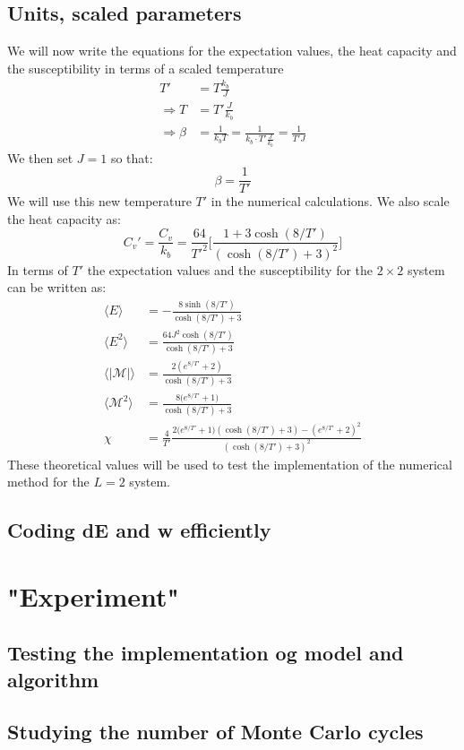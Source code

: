 \documentclass[11pt,a4wide]{article}
\begin{document}
\subsection{Units, scaled parameters}
We will now write the equations for the expectation values, the heat capacity and the susceptibility in terms of a scaled temperature
\begin{align*}
T' &= T \frac{k_b}{J} \\
\Rightarrow T &= T'\frac{J}{k_b}\\
\Rightarrow \beta &= \frac{1}{k_bT} = \frac{1}{k_b\cdot T'\frac{J}{k_b}} = \frac{1}{T'J}
\end{align*}
We then set $J=1$ so that:
\[
\beta = \frac{1}{T'}
\]
We will use this new temperature $T'$ in the numerical calculations. We also scale the heat capacity as:
\[
C_v' = \frac{C_v}{k_b} = \frac{64}{T'^2} \bigg[\frac{1 + 3\cosh(8/T')}{(\cosh(8/T') + 3)^2} \bigg]
\]
In terms of $T'$ the expectation values and the susceptibility for the $2\times 2$ system can be written as:
\begin{align}
\langle E \rangle &= -\frac{8\sinh(8/T')}{\cosh(8/T') + 3} \\
\langle E^2 \rangle &=\frac{64J^2 \cosh(8/T')}{\cosh(8/T') + 3} \\
\langle |\mathcal{M}| \rangle &= \frac{2(e^{8/T'}+ 2)}{\cosh(8/T') + 3}\\
\langle \mathcal{M}^2 \rangle &= \frac{8\big(e^{8/T'} + 1\big)}{\cosh(8/T') + 3} \\
\chi &= \frac{4}{T'} \frac{2(e^{8/T'} + 1\big)(\cosh(8/T') + 3) - (e^{8/T'}+ 2)^2}{(\cosh(8/T') + 3)^2} 
\end{align}
These theoretical values will be used to test the implementation of the numerical method for the $L=2$ system. 


\subsection{Coding dE  and w efficiently}


\section{"Experiment"}
\subsection{Testing the implementation og model and algorithm}

\subsection{Studying the number of Monte Carlo cycles}
\end{document}
